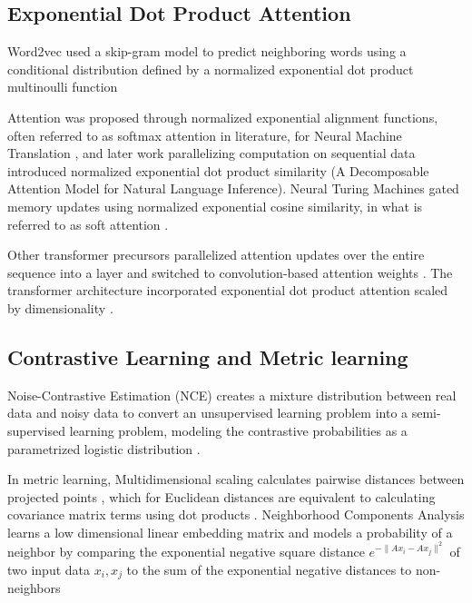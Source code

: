 \documentclass{article}
\begin{document}
\subsection{Exponential Dot Product Attention}
Word2vec used a skip-gram model to predict neighboring words using a conditional distribution defined by a normalized exponential dot product multinoulli function \cite{DBLP:journals/corr/MikolovSCCD13}

Attention was proposed through normalized exponential alignment functions, often referred to as softmax attention in literature, for Neural Machine Translation \cite{DBLP:journals/corr/Graves13,bahdanau2014neural}, and later work parallelizing computation on sequential data introduced normalized exponential dot product similarity \cite{DBLP:journals/corr/ParikhT0U16} (A Decomposable Attention Model for Natural Language Inference).
Neural Turing Machines gated memory updates using normalized exponential cosine similarity, in what is referred to as soft attention \cite{DBLP:journals/corr/GravesWD14}.

Other transformer precursors parallelized attention updates over the entire sequence into a layer and switched to convolution-based attention weights \cite{kaiser2016neural,DBLP:journals/corr/KaiserB16}. 
The transformer architecture incorporated exponential dot product attention scaled by dimensionality \cite{vaswani2017attention}. 

\subsection{Contrastive Learning and Metric learning}
\label{contrastive}
Noise-Contrastive Estimation (NCE) creates a mixture distribution between real data and noisy data to convert an unsupervised learning problem into a semi-supervised learning problem, modeling the contrastive probabilities as a parametrized logistic distribution \cite{Gutmann2010}.

In metric learning, Multidimensional scaling calculates pairwise distances between projected points \cite{cox2000multidimensional}, which for Euclidean distances are equivalent to calculating covariance matrix terms using dot products \cite{bishop2007}.
Neighborhood Components Analysis learns a low dimensional linear embedding matrix and models a probability of a neighbor by comparing the exponential negative square distance
$
  e^{ - \lVert A x_i - A x_j \rVert^2 }
$
of two input data $x_i,x_j$ to the sum of the exponential negative distances to non-neighbors \cite{conf/nips/GoldbergerRHS04}
\end{document}

